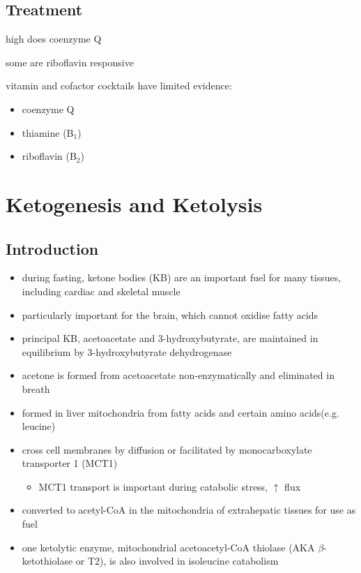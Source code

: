 \documentclass{scrartcl}
\begin{document}
\subsection{Treatment}
\label{sec:orgc649968}
\begin{description}
\item[{Coenzyme Q disorders}] high does coenzyme Q
\item[{CI deficiency}] some are riboflavin responsive
\item vitamin and cofactor cocktails have limited evidence:
\begin{itemize}
\item coenzyme Q
\item thiamine (B\(_{\text{1}}\))
\item riboflavin (B\(_{\text{2}}\))
\end{itemize}
\end{description}
\section{Ketogenesis and Ketolysis}
\label{sec:org86fa429}
\subsection{Introduction}
\label{sec:org2e28ecd}
\begin{itemize}
\item during fasting, ketone bodies (KB) are an important fuel for many
tissues, including cardiac and skeletal muscle
\item particularly important for the brain, which cannot oxidise fatty acids
\item principal KB, acetoacetate and 3-hydroxybutyrate, are
maintained in equilibrium by 3-hydroxybutyrate dehydrogenase


\item acetone is formed from acetoacetate non-enzymatically and eliminated in breath
\item formed in liver mitochondria from fatty acids and certain amino acids(e.g. leucine)
\item cross cell membranes by diffusion or facilitated by monocarboxylate transporter 1 (MCT1)
\begin{itemize}
\item MCT1 transport is important during catabolic stress, \(\uparrow\) flux
\end{itemize}
\item converted to acetyl-CoA in the mitochondria of extrahepatic tissues for use as fuel
\item one ketolytic enzyme, mitochondrial acetoacetyl-CoA thiolase (AKA
\(\beta\)-ketothiolase or T2), is also involved in isoleucine catabolism
\end{itemize}
\end{document}
